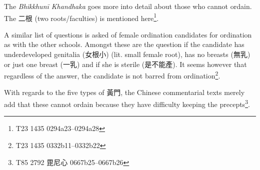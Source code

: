 The {\em Bhikkhunī Khandhaka} goes more into detail about those who cannot ordain. The 二根 (two roots/faculties) is mentioned here\footnote{T23 1435 0294a23–0294a28}. 

A similar list of questions is asked of female ordination candidates for ordination as with the other schools. Amongst these are the question if the candidate has underdeveloped genitalia (女根小) (lit. small female root), has no breasts (無乳) or just one breast (一乳) and if she is sterile (是不能產). It seems however that regardless of the answer, the candidate is not barred from ordination\footnote{T23 1435 0332b11–0332b22}.

With regards to the five types of 黃門, the Chinese commentarial texts merely add that these cannot ordain because they have difficulty keeping the precepts\footnote{T85 2792 毘尼心 0667b25–0667b26}.
